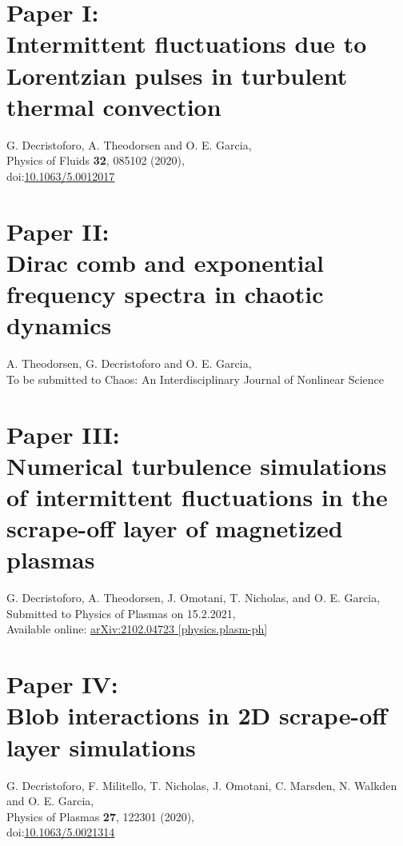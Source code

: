 \documentclass[11pt,twoside,openright]{book}
\begin{document}
\chapter{Paper I: \\ Intermittent fluctuations due to Lorentzian pulses in turbulent thermal convection}
G. Decristoforo, A. Theodorsen and O. E. Garcia,\\
Physics of Fluids {\bf 32}, 085102 (2020),\\
doi:\href{https://doi.org/10.1063/5.0012017}{10.1063/5.0012017}
\newpage\null\newpage


\chapter{Paper II: \\ Dirac comb and exponential frequency spectra in chaotic dynamics}
A. Theodorsen, G. Decristoforo and O. E. Garcia,\\
To be submitted to Chaos: An Interdisciplinary Journal of Nonlinear Science
\newpage\null\newpage


\chapter{Paper III: \\ Numerical turbulence simulations of intermittent fluctuations in the scrape-off layer of magnetized plasmas}
G. Decristoforo, A. Theodorsen, J. Omotani, T. Nicholas, and O. E. Garcia,\\
Submitted to Physics of Plasmas on 15.2.2021,\\
Available online: \href{https://arxiv.org/abs/2102.04723}{arXiv:2102.04723 [physics.plasm-ph]}
\newpage\null\newpage


\chapter{Paper IV: \\ Blob interactions in 2D scrape-off layer simulations}
G. Decristoforo, F. Militello, T. Nicholas, J. Omotani, C. Marsden, N. Walkden and O. E. Garcia,\\
Physics of Plasmas {\bf 27}, 122301 (2020),\\
doi:\href{https://doi.org/10.1063/5.0021314}{10.1063/5.0021314}
\newpage\null\newpage

\end{document}
